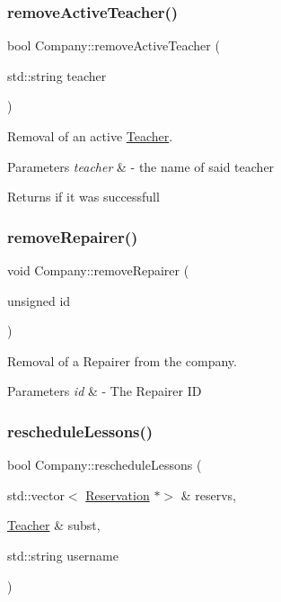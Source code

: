 \subsubsection{\texorpdfstring{remove\+Active\+Teacher()}{removeActiveTeacher()}}
{\footnotesize\ttfamily bool Company\+::remove\+Active\+Teacher (\begin{DoxyParamCaption}\item[{std\+::string}]{teacher }\end{DoxyParamCaption})}



Removal of an active \mbox{\hyperlink{class_teacher}{Teacher}}. 


\begin{DoxyParams}{Parameters}
{\em teacher} & -\/ the name of said teacher \\
\hline
\end{DoxyParams}
\begin{DoxyReturn}{Returns}
if it was successfull 
\end{DoxyReturn}
\mbox{\label{class_company_af7f0b784eb184ae92f5c8d0c8bad0f09}} 
\subsubsection{\texorpdfstring{remove\+Repairer()}{removeRepairer()}}
{\footnotesize\ttfamily void Company\+::remove\+Repairer (\begin{DoxyParamCaption}\item[{unsigned}]{id }\end{DoxyParamCaption})}



Removal of a Repairer from the company. 


\begin{DoxyParams}{Parameters}
{\em id} & -\/ The Repairer ID \\
\hline
\end{DoxyParams}
\mbox{\label{class_company_ae858645003e1a2cd2e38f6db4feda488}} 
\subsubsection{\texorpdfstring{reschedule\+Lessons()}{rescheduleLessons()}}
{\footnotesize\ttfamily bool Company\+::reschedule\+Lessons (\begin{DoxyParamCaption}\item[{std\+::vector$<$ \mbox{\hyperlink{class_reservation}{Reservation}} $\ast$$>$ \&}]{reservs,  }\item[{\mbox{\hyperlink{class_teacher}{Teacher}} \&}]{subst,  }\item[{std\+::string}]{username }\end{DoxyParamCaption})}



